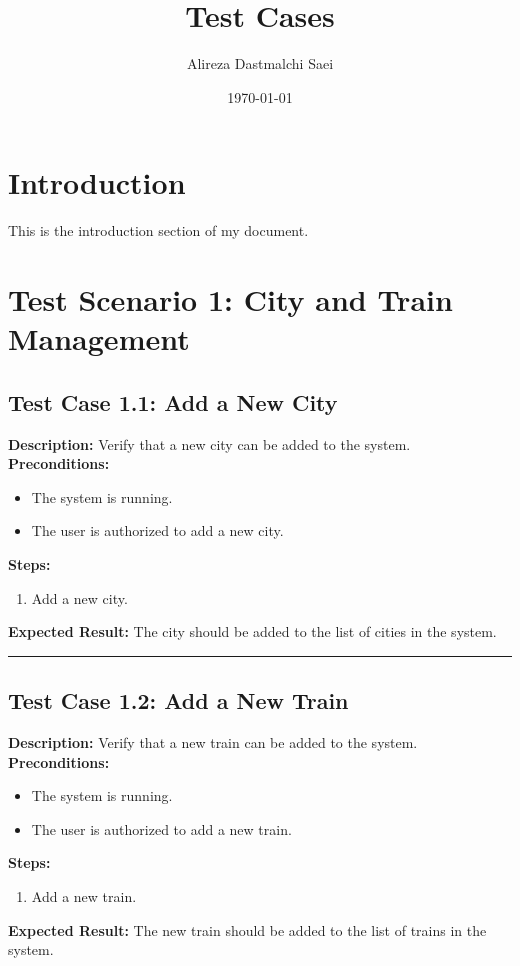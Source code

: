 \documentclass{article}
\title{Test Cases}
\author{Alireza Dastmalchi Saei}
\date{\today}
\begin{document}
\maketitle

\section{Introduction}

This is the introduction section of my document.

\pagebreak

\section{Test Scenario 1: City and Train Management}
\bigskip
\bigskip
\subsection{Test Case 1.1: Add a New City}

\textbf{Description:} Verify that a new city can be added to the system.\\
\textbf{Preconditions:}
\begin{itemize}
  \item The system is running.
  \item The user is authorized to add a new city.
\end{itemize}
\textbf{Steps:}
\begin{enumerate}
  \item Add a new city.
\end{enumerate}
\textbf{Expected Result:} The city should be added to the list of cities in the system.

\bigskip
\hrule
\bigskip


\subsection{Test Case 1.2: Add a New Train}

\textbf{Description:} Verify that a new train can be added to the system.\\
\textbf{Preconditions:}
\begin{itemize}
  \item The system is running.
  \item The user is authorized to add a new train.
\end{itemize}
\textbf{Steps:}
\begin{enumerate}
  \item Add a new train.
\end{enumerate}
\textbf{Expected Result:} The new train should be added to the list of trains in the system.
\end{document}
